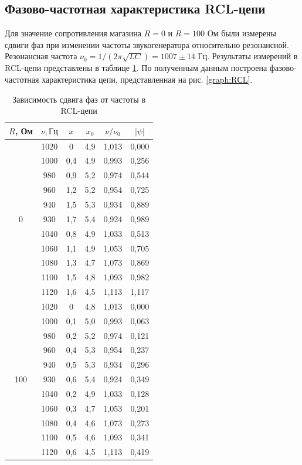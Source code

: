 \documentclass[a4paper,12pt]{article} %
\begin{document}
\subsection{Фазово-частотная характеристика RCL-цепи}

Для значение сопротивления магазина $R = 0$ и $R = 100$ Ом были измерены сдвиги фаз при изменении частоты звукогенератора относительно резонансной. Резонансная частота $\nu_0 = 1/(2\pi\sqrt{LC}) = 1007 \pm 14$ Гц. Результаты измерений в RCL-цепи представлены в таблице \ref{tab:RCL}. По полученным данным построена фазово-частотная характеристика цепи, представленная на рис. \ref{graph:RСL}. 

\begin{table}
\centering
\begin{tabular}{|c|c|c|c|c|c|}
\hline
$R$, Ом & $\nu, \text{Гц}$ & $x$ & $x_0$ & $\nu/\nu_0$ & $|\psi|$ \\ \hline
\multirow{11}{*}{0}   
&1020	&0		&4,9	&1,013	&0,000	\\ \cline{2-6}
&1000	&0,4	&4,9	&0,993	&0,256	\\ \cline{2-6} 
&980	&0,9	&5,2	&0,974	&0,544	\\ \cline{2-6} 
&960	&1,2	&5,2	&0,954	&0,725	\\ \cline{2-6} 
&940	&1,5	&5,3	&0,934	&0,889	\\ \cline{2-6} 
&930	&1,7	&5,4	&0,924	&0,989	\\ \cline{2-6}
&1040	&0,8	&4,9	&1,033	&0,513	\\ \cline{2-6} 
&1060	&1,1	&4,9	&1,053	&0,705	\\ \cline{2-6} 
&1080	&1,3	&4,7	&1,073	&0,869	\\ \cline{2-6} 
&1100	&1,5	&4,8	&1,093	&0,982	\\ \cline{2-6} 
&1120	&1,6	&4,5	&1,113	&1,117	\\ \hline 
\multirow{11}{*}{100} 
&1020	&0		&4,8	&1,013	&0,000	\\ \cline{2-6}
&1000	&0,1	&5,0	&0,993	&0,063	\\ \cline{2-6}
&980	&0,2	&5,2	&0,974	&0,121	\\ \cline{2-6}
&960	&0,4	&5,3	&0,954	&0,237	\\ \cline{2-6}
&940	&0,5	&5,3	&0,934	&0,296	\\ \cline{2-6}
&930	&0,6	&5,4	&0,924	&0,349	\\ \cline{2-6}
&1040	&0,2	&4,9	&1,033	&0,128	\\ \cline{2-6}
&1060	&0,3	&4,7	&1,053	&0,201	\\ \cline{2-6}
&1080	&0,4	&4,6	&1,073	&0,273	\\ \cline{2-6}
&1100	&0,5	&4,6	&1,093	&0,341	\\ \cline{2-6}
&1120	&0,6	&4,5	&1,113	&0,419	\\ \hline 
\end{tabular}
\caption{Зависимость сдвига фаз от частоты в RCL-цепи}
\label{tab:RCL}
\end{table}
\end{document}
